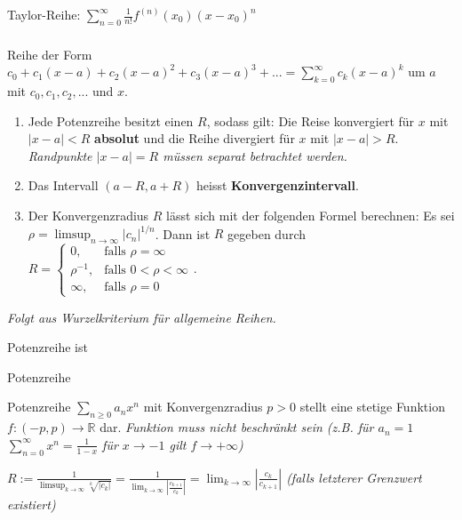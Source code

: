 Taylor-Reihe: $\sum_{n=0}^{\infty} \frac{1}{n!} f^{(n)}(x_0)(x-x_0)^n$


\subsubsection{}
Reihe der Form $c_0 + c_1(x-a) + c_2(x-a)^2 + c_3(x-a)^3 + ... = \sum_{k=0}^{\infty} c_k (x-a)^k$ um  $a$ mit  $c_0, c_1, c_2, ...$ und  $x$.

\begin{enumerate}
    \item Jede Potenzreihe besitzt einen  $R$, sodass gilt:
    Die Reise konvergiert für $x$ mit $|x-a|<R$ \textbf{absolut} und die Reihe divergiert für $x$ mit $|x-a|>R$.
    \textit{Randpunkte $|x-a|=R$ müssen separat betrachtet werden.}
    \item Das Intervall $(a-R,a+R)$ heisst \textbf{Konvergenzintervall}.
    \item Der Konvergenzradius $R$ lässt sich mit der folgenden Formel berechnen: Es sei $\rho = \limsup_{n \rightarrow \infty} |c_n|^{1/n}$.
    Dann ist $R$ gegeben durch $R = \begin{cases}
        0, & \text{falls } \rho = \infty\\
        \rho^{-1}, & \text{falls } 0 < \rho < \infty\\
        \infty, & \text{falls } \rho = 0 
    \end{cases}$.
\end{enumerate}
\textit{Folgt aus Wurzelkriterium für allgemeine Reihen.}

Potenzreihe ist 

Potenzreihe  

{\color{gray}
Potenzreihe $\sum_{n\geq 0}a_nx^n$ mit Konvergenzradius $p>0$ stellt eine stetige Funktion $f:(-p,p)\to \mathbb{R}$ dar. 
\textit{Funktion muss nicht beschränkt sein (z.B. für $a_n=1$ $\sum_{n=0}^{\infty}x^n=\frac{1}{1-x}$ für $x \to -1$ gilt $f \to + \infty$)}
}

\begin{exercise}
\textit{$R:= \frac{1}{\limsup_{k \rightarrow \infty}\sqrt[k]{|c_k|}} = \frac{1}{\lim_{k \rightarrow \infty} |\frac{c_{k+1}}{c_k}|}=\lim_{k \rightarrow \infty}|\frac{c_k}{c_{k+1}}|$ (falls letzterer Grenzwert existiert)}    
\end{exercise}

